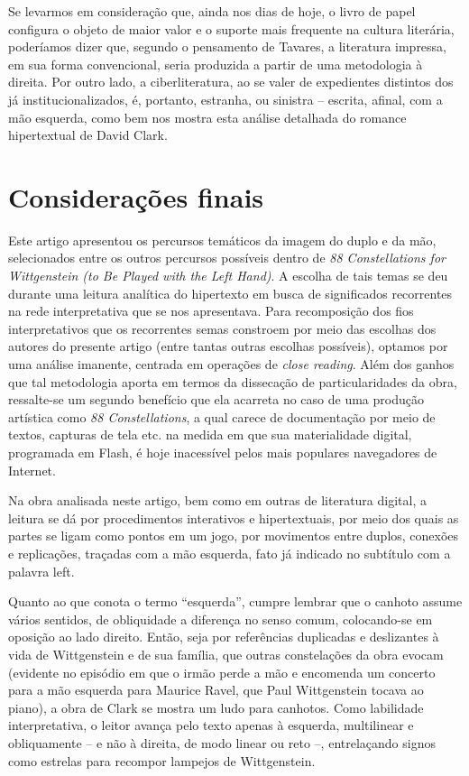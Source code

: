\documentclass[portuguese]{textolivre}
\begin{document}
Se levarmos em consideração que, ainda nos dias de hoje, o livro de papel configura o objeto de maior valor e o suporte mais frequente na cultura literária, poderíamos dizer que, segundo o pensamento de Tavares, a literatura impressa, em sua forma convencional, seria produzida a partir de uma metodologia à direita. Por outro lado, a ciberliteratura, ao se valer de expedientes distintos dos já institucionalizados, é, portanto, estranha, ou sinistra – escrita, afinal, com a mão esquerda, como bem nos mostra esta análise detalhada do romance hipertextual de David Clark. 

\section{Considerações finais}
Este artigo apresentou os percursos temáticos da imagem do duplo e da mão, selecionados entre os outros percursos possíveis dentro de \emph{88 Constellations for Wittgenstein (to Be Played with the Left Hand)}. A escolha de tais temas se deu durante uma leitura analítica do hipertexto em busca de significados recorrentes na rede interpretativa que se nos apresentava. Para recomposição dos fios interpretativos que os recorrentes semas constroem por meio das escolhas dos autores do presente artigo (entre tantas outras escolhas possíveis), optamos por uma análise imanente, centrada em operações de \emph{close reading}. Além dos ganhos que tal metodologia aporta em termos da dissecação de particularidades da obra, ressalte-se um segundo benefício que ela acarreta no caso de uma produção artística como \emph{88 Constellations}, a qual carece de documentação por meio de textos, capturas de tela etc. na medida em que sua materialidade digital, programada em Flash, é hoje inacessível pelos mais populares navegadores de Internet.

Na obra analisada neste artigo, bem como em outras de literatura digital, a leitura se dá por procedimentos interativos e hipertextuais, por meio dos quais as partes se ligam como pontos em um jogo, por movimentos entre duplos, conexões e replicações, traçadas com a mão esquerda, fato já indicado no subtítulo com a palavra left. 

Quanto ao que conota o termo “esquerda”, cumpre lembrar que o canhoto assume vários sentidos, de obliquidade a diferença no senso comum, colocando-se em oposição ao lado direito. Então, seja por referências duplicadas e deslizantes à vida de Wittgenstein e de sua família, que outras constelações da obra evocam (evidente no episódio em que o irmão perde a mão e encomenda um concerto para a mão esquerda para Maurice Ravel, que Paul Wittgenstein tocava ao piano), a obra de Clark se mostra um ludo para canhotos. Como labilidade interpretativa, o leitor avança pelo texto apenas à esquerda, multilinear e obliquamente – e não à direita, de modo linear ou reto –, entrelaçando signos como estrelas para recompor lampejos de Wittgenstein. 
\end{document}

